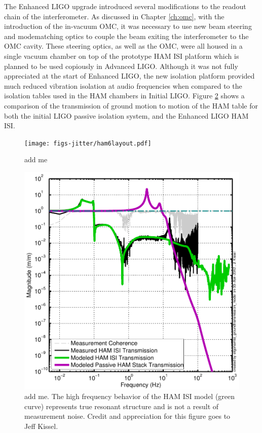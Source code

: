 The Enhanced LIGO upgrade introduced several modifications to the readout chain of the interferometer. %
As discussed in Chapter \ref{ch:omc}, with the introduction of the in-vacuum OMC, it was necessary to use new beam steering and modematching optics to couple the beam exiting the interferometer to the OMC cavity. %
These steering optics, as well as the OMC, were all housed in a single vacuum chamber on top of the prototype HAM ISI platform which is planned to be used copiously in Advanced LIGO. %
Although it was not fully appreciated at the start of Enhanced LIGO, the new isolation platform provided much reduced vibration isolation at audio frequencies when compared to the isolation tables used in the HAM chambers in Initial LIGO. %
Figure \ref{fig:hamtransmission} shows a comparison of the transmission of ground motion to motion of the HAM table for both the initial LIGO passive isolation system, and the Enhanced LIGO HAM ISI.

\begin{figure}
  \begin{center}
  \leavevmode
  \texttt{[image: figs-jitter/ham6layout.pdf]}
  \end{center}
  \caption[add me]{add me }
  \label{fig:ham6layout}
\end{figure}

\begin{figure}
  \begin{center}
  \leavevmode
  \includegraphics{figs-jitter/hamtransmission.pdf}
  \end{center}
  \caption[add me]{add me. The high frequency behavior of the HAM ISI model (green curve) represents true resonant structure and is not a result of measurement noise. Credit and appreciation for this figure goes to Jeff Kissel.}
  \label{fig:hamtransmission}
\end{figure}

